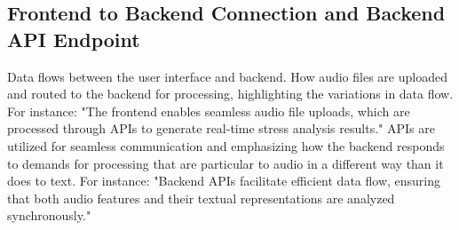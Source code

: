\documentclass[Arial,12pt,openright,twoside]{book}
\begin{document}
\subsection{Frontend to Backend Connection and Backend API Endpoint}
Data flows between the user interface and backend. How audio files are uploaded and routed to the backend for processing, highlighting the variations in data flow. 
For instance: "The frontend enables seamless audio file uploads, which are processed through APIs to generate real-time stress analysis results." 
APIs are utilized for seamless communication and emphasizing how the backend responds to demands for processing that are particular to audio in a different way than it does to text. 
For instance: "Backend APIs facilitate efficient data flow, ensuring that both audio features and their textual representations are analyzed synchronously." 
\end{document}

